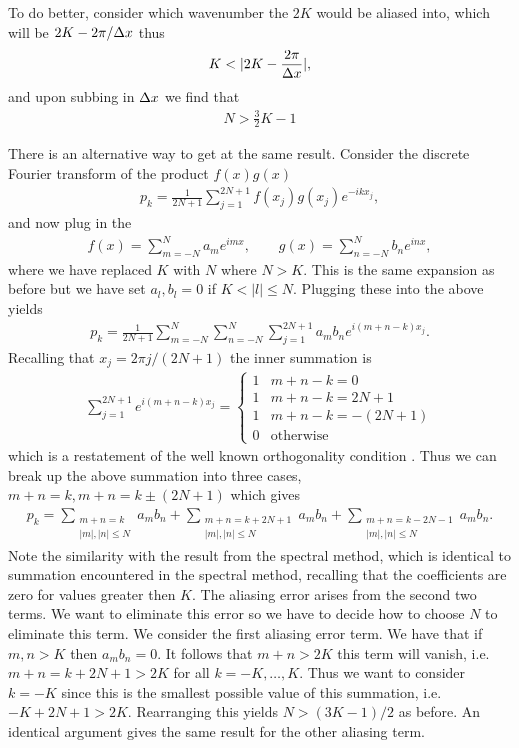 To do better, consider which wavenumber the $2K$ would be aliased into, which will be $2K-2\pi/\Delta x$ thus
\begin{align}
K<|2K- \frac{2\pi}{\dx}|,
\end{align}
and upon subbing in $\Delta x$ we find that 
\begin{align}
N > \frac{3}{2}K - 1
\end{align}

There is an alternative way to get at the same result. Consider the discrete Fourier transform of the product $f(x)g(x)$
\begin{align}
p_{k} = \frac{1}{2N+1}\sum_{j=1}^{2N+1}f(x_{j})g(x_{j})e^{-ikx_{j}},
\end{align}
and now plug in the 
\begin{align}
f(x) = \sum_{m=-N}^{N}a_{m}e^{imx}, \qquad g(x) = \sum_{n=-N}^{N}b_{n}e^{inx},
\end{align}
where we have replaced $K$ with $N$ where $N>K$. This is the same expansion as before but we have set $a_{l},b_{l}=0$ if $K < |l|\le N$. Plugging these into the above yields
\begin{align}
p_{k} = \frac{1}{2N+1}\sum_{m=-N}^{N}\sum_{n=-N}^{N}\sum_{j=1}^{2N+1}a_{m}b_{n}e^{i(m+n-k)x_{j}}.
\end{align}
Recalling that $x_{j} = 2\pi j/(2N+1)$ the inner summation is
\begin{align}
\sum_{j=1}^{2N+1}e^{i(m+n-k)x_{j}} =  \begin{cases}
1 & m+n-k =0\\
1 & m+n-k =2N+1\\
1 & m+n-k =-(2N+1)\\
0 & \text{otherwise}
\end{cases}
\end{align}
which is a restatement of the well known orthogonality condition \cite{durran}. Thus we can break up the above summation into three cases, $m+n=k, m+n=k\pm(2N+1)$ which gives
\begin{align}
p_{k} = \sum_{\substack{m+n=k\\ |m|,|n|\le N}}a_{m}b_{n}+  \sum_{\substack{m+n=k+2N+1\\ |m|,|n|\le N}}a_{m}b_{n}+ \sum_{\substack{m+n=k-2N-1\\ |m|,|n|\le N}}a_{m}b_{n}.
\end{align}
Note the similarity with the result from the spectral method, which is identical to summation encountered in the spectral method, recalling that the coefficients are zero for values greater then $K$. The aliasing error arises from the second two terms. We want to eliminate this error so we have to decide how to choose $N$ to eliminate this term. We consider the first aliasing error term. We have that if $m,n>K$ then $a_{m}b_{n}=0$. It follows that $m+n>2K$ this term will vanish, i.e. $m+n=k+2N+1>2K$ for all $k=-K,\ldots,K$. Thus we want to consider $k=-K$ since this is the smallest possible value of this summation, i.e. $-K+2N+1>2K$. Rearranging this yields $N>(3K-1)/2$ as before. An identical argument gives the same result for the other aliasing term. 

